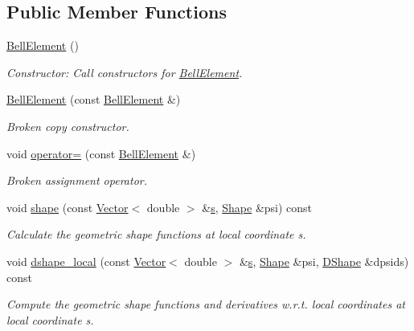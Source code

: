 \subsection*{Public Member Functions}
\begin{DoxyCompactItemize}
\item 
\hyperlink{classoomph_1_1BellElement_aa5c3a8bc5c7b87ce5ee6fdb6b4281180}{Bell\+Element} ()
\begin{DoxyCompactList}\small\item\em Constructor\+: Call constructors for \hyperlink{classoomph_1_1BellElement}{Bell\+Element}. \end{DoxyCompactList}\item 
\hyperlink{classoomph_1_1BellElement_aa6f76e5cba1c201863b6d45693629c2f}{Bell\+Element} (const \hyperlink{classoomph_1_1BellElement}{Bell\+Element} \&)
\begin{DoxyCompactList}\small\item\em Broken copy constructor. \end{DoxyCompactList}\item 
void \hyperlink{classoomph_1_1BellElement_a60d06c5a989f698d550368e30760c004}{operator=} (const \hyperlink{classoomph_1_1BellElement}{Bell\+Element} \&)
\begin{DoxyCompactList}\small\item\em Broken assignment operator. \end{DoxyCompactList}\item 
void \hyperlink{classoomph_1_1BellElement_adcf9c26fca0f635473b1f0a0ff45e47d}{shape} (const \hyperlink{classoomph_1_1Vector}{Vector}$<$ double $>$ \&\hyperlink{cfortran_8h_ab7123126e4885ef647dd9c6e3807a21c}{s}, \hyperlink{classoomph_1_1Shape}{Shape} \&psi) const
\begin{DoxyCompactList}\small\item\em Calculate the geometric shape functions at local coordinate s. \end{DoxyCompactList}\item 
void \hyperlink{classoomph_1_1BellElement_a3aba354751518a5f1bfe95c531e3d464}{dshape\+\_\+local} (const \hyperlink{classoomph_1_1Vector}{Vector}$<$ double $>$ \&\hyperlink{cfortran_8h_ab7123126e4885ef647dd9c6e3807a21c}{s}, \hyperlink{classoomph_1_1Shape}{Shape} \&psi, \hyperlink{classoomph_1_1DShape}{D\+Shape} \&dpsids) const
\begin{DoxyCompactList}\small\item\em Compute the geometric shape functions and derivatives w.\+r.\+t. local coordinates at local coordinate s. \end{DoxyCompactList}\item 

\end{DoxyCompactItemize}
